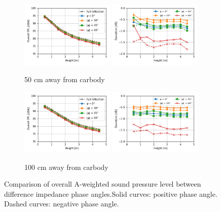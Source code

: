 \begin{figure}[H]\ContinuedFloat
	\begin{subfigure}[b]{\textwidth}
		\centering
		\includegraphics[width=0.49\textwidth]{fig/chap5/impedance/overall_SPL/overall_SPL_pos_f.png}
		\includegraphics[width=0.49\textwidth]{fig/chap5/impedance/overall_SPL/deviation_pos_f.png}
		\caption{50 cm away from carbody}
	\end{subfigure}
	\begin{subfigure}[b]{\textwidth}
		\centering
		\includegraphics[width=0.49\textwidth]{fig/chap5/impedance/overall_SPL/overall_SPL_pos_g.png}
		\includegraphics[width=0.49\textwidth]{fig/chap5/impedance/overall_SPL/deviation_pos_g.png}
		\caption{100 cm away from carbody}
	\end{subfigure}
	
	\caption{Comparison of overall A-weighted sound pressure level between difference impedance phase angles.Solid curves: positive phase angle. Dashed curves: negative phase angle.}
	\label{fig:overall_SPL_impedance}
\end{figure}

